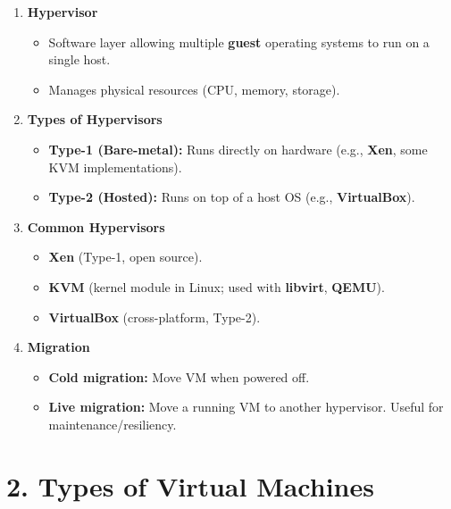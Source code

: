 \documentclass[a4paper]{report}
\begin{document}
\begin{enumerate}
    \item \textbf{Hypervisor}
    \begin{itemize}
        \item Software layer allowing multiple \textbf{guest} operating systems to run on a single host.
        \item Manages physical resources (CPU, memory, storage).
    \end{itemize}

    \item \textbf{Types of Hypervisors}
    \begin{itemize}
        \item \textbf{Type-1 (Bare-metal):} Runs directly on hardware (e.g., \textbf{Xen}, some KVM implementations).
        \item \textbf{Type-2 (Hosted):} Runs on top of a host OS (e.g., \textbf{VirtualBox}).
    \end{itemize}

    \item \textbf{Common Hypervisors}
    \begin{itemize}
        \item \textbf{Xen} (Type-1, open source).
        \item \textbf{KVM} (kernel module in Linux; used with \textbf{libvirt}, \textbf{QEMU}).
        \item \textbf{VirtualBox} (cross-platform, Type-2).
    \end{itemize}

    \item \textbf{Migration}
    \begin{itemize}
        \item \textbf{Cold migration:} Move VM when powered off.
        \item \textbf{Live migration:} Move a running VM to another hypervisor. Useful for maintenance/resiliency.
    \end{itemize}
\end{enumerate}

\section*{2. Types of Virtual Machines}
\end{document}

